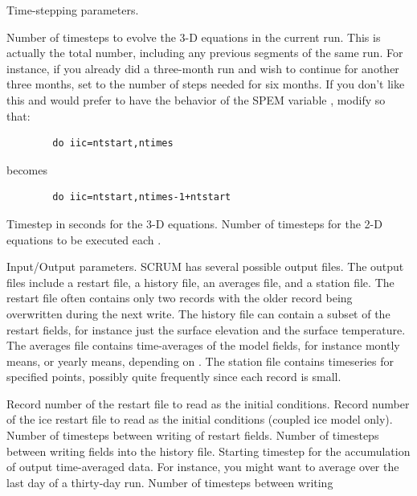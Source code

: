 \begin{klist}
    Time-stepping parameters.
     \begin{klist}
           Number of timesteps to evolve the 3-D
       equations in the current run.  This is actually the total
     number, including any previous segments of the same run.  For
     instance, if you already did a three-month run and wish to
     continue for another three months, set  to the
     number of steps needed for six months.  If you don't like this
     and would prefer to have the behavior of the SPEM variable
     , modify  so that:
     \begin{verbatim}
        do iic=ntstart,ntimes
     \end{verbatim}
     becomes
     \begin{verbatim}
        do iic=ntstart,ntimes-1+ntstart
     \end{verbatim}
               Timestep in seconds for the 3-D equations.
          Number of timesteps for the 2-D equations
     to be executed each .
     \end{klist}
      Input/Output parameters.  SCRUM has several
   possible output files.  The output files
   include a restart file, a history file, an averages file, and a
   station file.  The restart file often contains only two records with
   the older record being overwritten during the next write.  The
   history file can contain a subset of the restart fields, for
   instance just the surface elevation and the surface temperature.
   The averages file contains time-averages of the model fields, for
   instance montly means, or yearly means, depending on .
   The station file contains timeseries for specified points, possibly
   quite frequently since each record is small.
     \begin{klist}
            Record number of the restart file to read
     as the initial conditions.
           Record number of the ice restart file to read
     as the initial conditions (coupled ice model only).
             Number of timesteps between writing of
     restart fields.
             Number of timesteps between writing fields
     into the history file.
           Starting timestep for the accumulation of
     output time-averaged data.  For instance, you might want to average
     over the last day of a thirty-day run.
             Number of timesteps between writing

\end{klist}
\end{klist}
